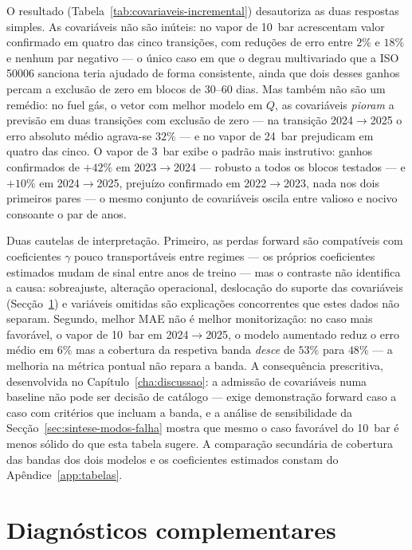 O resultado (Tabela~\ref{tab:covariaveis-incremental}) desautoriza as duas respostas
simples. As covariáveis não são inúteis: no vapor de 10~bar acrescentam valor
confirmado em quatro das cinco transições, com reduções de erro entre $2\%$ e
$18\%$ e nenhum par negativo --- o único caso em que o degrau multivariado
que a ISO 50006 sanciona teria ajudado de forma consistente, ainda que dois
desses ganhos percam a exclusão de zero em blocos de 30--60 dias. Mas também
não são um remédio: no fuel gás, o vetor com melhor modelo em $Q$, as
covariáveis \emph{pioram} a previsão em duas transições com exclusão de zero
--- na transição 2024${\to}$2025 o erro absoluto médio agrava-se $32\%$ --- e
no vapor de 24~bar prejudicam em quatro das cinco. O vapor de 3~bar exibe o
padrão mais instrutivo: ganhos confirmados de $+42\%$ em 2023${\to}$2024 ---
robusto a todos os blocos testados --- e $+10\%$ em 2024${\to}$2025, prejuízo
confirmado em 2022${\to}$2023, nada nos dois primeiros pares --- o mesmo
conjunto de covariáveis oscila entre valioso e nocivo consoante o par de
anos.

Duas cautelas de interpretação. Primeiro, as perdas forward são compatíveis
com coeficientes $\gamma$ pouco transportáveis entre regimes --- os próprios
coeficientes estimados mudam de sinal entre anos de treino --- mas o contraste
não identifica a causa: sobreajuste, alteração operacional, deslocação do
suporte das covariáveis (Secção~\ref{sec:diagnosticos-desc}) e variáveis
omitidas são explicações concorrentes que estes dados não separam. Segundo,
melhor MAE não é melhor monitorização: no caso mais favorável, o vapor de
10~bar em 2024${\to}$2025, o modelo aumentado reduz o erro médio em $6\%$ mas
a cobertura da respetiva banda \emph{desce} de $53\%$ para $48\%$ --- a
melhoria na métrica pontual não repara a banda. A consequência prescritiva,
desenvolvida no Capítulo~\ref{cha:discussao}: a admissão de covariáveis numa
baseline não pode ser decisão de catálogo --- exige demonstração forward caso
a caso com critérios que incluam a banda, e a análise de sensibilidade da
Secção~\ref{sec:sintese-modos-falha} mostra que mesmo o caso favorável do
10~bar é menos sólido do que esta tabela sugere. A comparação secundária de
cobertura das bandas dos dois modelos e os coeficientes estimados constam do
Apêndice~\ref{app:tabelas}.


\section{Diagnósticos complementares}
\label{sec:diagnosticos-desc}


